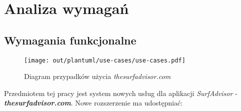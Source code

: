 \chapter{Analiza wymagań}
\label{cha:srs}

\section{Wymagania funkcjonalne}

\begin{figure}[!ht]
	\begin{center}
		\texttt{[image: out/plantuml/use-cases/use-cases.pdf]}
	\end{center}
    \caption{Diagram przypadków użycia \emph{thesurfadvisor.com}}
\end{figure}

Przedmiotem tej pracy jest system nowych usług dla aplikacji \emph{SurfAdvisor} - \textbf{\emph{thesurfadvisor.com}}.
Nowe rozszerzenie ma udostępniać:

